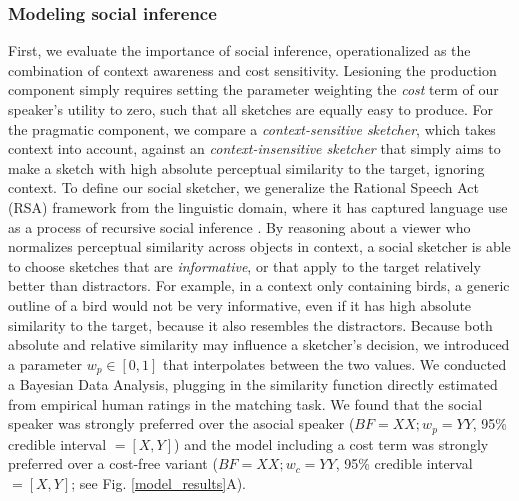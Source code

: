 \documentclass[9pt,twocolumn,twoside]{pnas-new}
\begin{document}

\subsubsection*{Modeling social inference}


First, we evaluate the importance of social inference, operationalized as the combination of context awareness and cost sensitivity.  
Lesioning the production component simply requires setting the parameter weighting the \emph{cost} term of our speaker's utility to zero, such that all sketches are equally easy to produce. For the pragmatic component, we compare a \emph{context-sensitive sketcher}, which takes context into account, against an \emph{context-insensitive sketcher} that simply aims to make a sketch with high absolute perceptual similarity to the target, ignoring context. To define our social sketcher, we generalize the Rational Speech Act (RSA) framework from the linguistic domain, where it has captured language use as a process of recursive social inference \cite{goodman2016pragmatic,kao2014formalizing,goodman2013knowledge}. By reasoning about a viewer who normalizes perceptual similarity across objects in context, a social sketcher is able to choose sketches that are \emph{informative}, or that apply to the target relatively better than distractors. For example, in a context only containing birds, a generic outline of a bird would not be very informative, even if it has high absolute similarity to the target, because it also resembles the distractors. Because both absolute and relative similarity may influence a sketcher's decision, we introduced a parameter $w_p \in [0,1]$ that interpolates between the two values. We conducted a Bayesian Data Analysis, plugging in the similarity function directly estimated from empirical human ratings in the matching task. We found that the social speaker was strongly preferred over the asocial speaker ($BF = XX; w_p = YY$, 95\% credible interval $= [X, Y]$) and the model including a cost term was strongly preferred over a cost-free variant ($BF = XX; w_c = YY$, 95\% credible interval $=[X, Y]$; see Fig. \ref{model_results}A).
\end{document}

